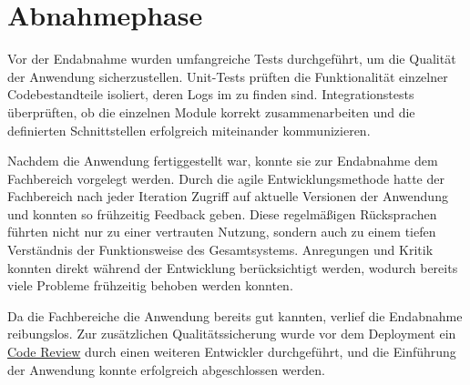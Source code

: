 \section{Abnahmephase} 
\label{sec:Abnahmephase}

Vor der Endabnahme wurden umfangreiche Tests durchgeführt, um die Qualität der Anwendung sicherzustellen. Unit-Tests prüften die Funktionalität einzelner Codebestandteile isoliert, deren Logs im  zu finden sind. Integrationstests überprüften, ob die einzelnen Module korrekt zusammenarbeiten und die definierten Schnittstellen erfolgreich miteinander kommunizieren.

Nachdem die Anwendung fertiggestellt war, konnte sie zur Endabnahme dem Fachbereich vorgelegt werden. Durch die agile Entwicklungsmethode hatte der Fachbereich nach jeder Iteration Zugriff auf aktuelle Versionen der Anwendung und konnten so frühzeitig Feedback geben. Diese regelmäßigen Rücksprachen führten nicht nur zu einer vertrauten Nutzung, sondern auch zu einem tiefen Verständnis der Funktionsweise des Gesamtsystems. Anregungen und Kritik konnten direkt während der Entwicklung berücksichtigt werden, wodurch bereits viele Probleme frühzeitig behoben werden konnten.

Da die Fachbereiche die Anwendung bereits gut kannten, verlief die Endabnahme reibungslos. Zur zusätzlichen Qualitätssicherung wurde vor dem Deployment ein \hyperlink{CodeReview}{\textcolor{AOBlau}{Code Review}} durch einen weiteren Entwickler durchgeführt, und die Einführung der Anwendung konnte erfolgreich abgeschlossen werden.
